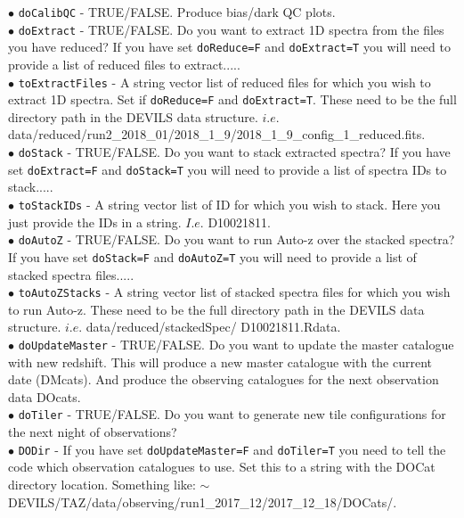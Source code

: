 \documentclass[12pt]{article}
\begin{document}
$\bullet$ \texttt{doCalibQC} - TRUE/FALSE. Produce bias/dark QC plots.\\

$\bullet$ \texttt{doExtract} - TRUE/FALSE. Do you want to extract 1D spectra from the files you have reduced? If you have set \texttt{doReduce=F} and \texttt{doExtract=T} you will need to provide a list of reduced files to extract..... \\

$\bullet$ \texttt{toExtractFiles} - A string vector list of reduced files for which you wish to extract 1D spectra. Set if \texttt{doReduce=F} and \texttt{doExtract=T}. These need to be the full directory path in the DEVILS data structure. $i.e.$ data/reduced/run2\_2018\_01/2018\_1\_9/2018\_1\_9\_config\_1\_reduced.fits. \\

$\bullet$ \texttt{doStack} - TRUE/FALSE. Do you want to stack extracted spectra? If you have set \texttt{doExtract=F} and \texttt{doStack=T} you will need to provide a list of spectra IDs to stack..... \\

$\bullet$ \texttt{toStackIDs} - A string vector list of ID for which you wish to stack. Here you just provide the IDs in a string. $I.e.$ D10021811.\\

$\bullet$ \texttt{doAutoZ} - TRUE/FALSE. Do you want to run Auto-z over the stacked spectra? If you have set \texttt{doStack=F} and \texttt{doAutoZ=T} you will need to provide a list of stacked spectra files..... \\

$\bullet$ \texttt{toAutoZStacks} - A string vector list of stacked spectra files for which you wish to run Auto-z. These need to be the full directory path in the DEVILS data structure. $i.e.$ data/reduced/stackedSpec/ D10021811.Rdata. \\

$\bullet$ \texttt{doUpdateMaster} - TRUE/FALSE. Do you want to update the master catalogue with new redshift. This will produce a new master catalogue with the current date (DMcats). And produce the observing catalogues for the next observation data DOcats. \\ 

$\bullet$ \texttt{doTiler} -  TRUE/FALSE. Do you want to generate new tile configurations for the next night of observations? \\

$\bullet$ \texttt{DODir} - If you have set \texttt{doUpdateMaster=F} and \texttt{doTiler=T} you need to tell the code which observation catalogues to use. Set this to a string with the DOCat directory location. Something like: $\sim$DEVILS/TAZ/data/observing/run1\_2017\_12/2017\_12\_18/DOCats/.\\
\end{document}
